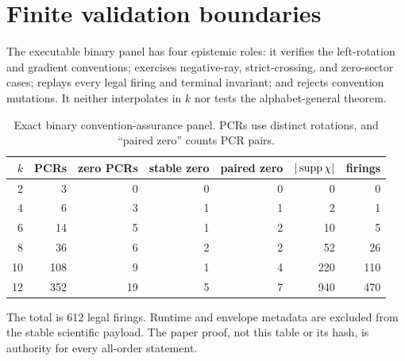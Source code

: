 \section{Finite validation boundaries}
\label{app:finite}

The executable binary panel has four epistemic roles: it verifies the
left-rotation and gradient conventions; exercises negative-ray,
strict-crossing, and zero-sector cases; replays every legal firing and
terminal invariant; and rejects convention mutations.  It neither
interpolates in $k$ nor tests the alphabet-general theorem.

\begin{table}[ht]
\centering
\small
\begin{tabular}{rrrrrrr}
\toprule
$k$ & PCRs & zero PCRs & stable zero & paired zero & $|\operatorname{supp}\chi|$ & firings\\
\midrule
2  & 3   & 0  & 0 & 0 & 0   & 0\\
4  & 6   & 3  & 1 & 1 & 2   & 1\\
6  & 14  & 5  & 1 & 2 & 10  & 5\\
8  & 36  & 6  & 2 & 2 & 52  & 26\\
10 & 108 & 9  & 1 & 4 & 220 & 110\\
12 & 352 & 19 & 5 & 7 & 940 & 470\\
\bottomrule
\end{tabular}
\caption{Exact binary convention-assurance panel.  PCRs use distinct
rotations, and ``paired zero'' counts PCR pairs.}
\label{tab:validation}
\end{table}

The total is 612 legal firings.  Runtime and envelope metadata are excluded
from the stable scientific payload.  The paper proof, not this table or its
hash, is authority for every all-order statement.
